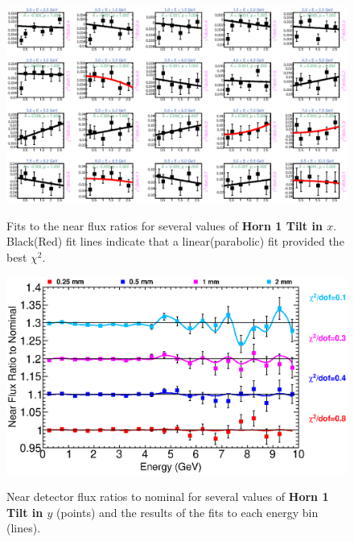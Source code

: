 {\begin{figure}[ht]
  \begin{center}
    {\includegraphics[width=5.0in]{figures/Horn1XTilt_near_fits.eps}}
  \end{center}
\caption{ Fits to the near flux ratios for several values of {\bf Horn 1 Tilt in $x$}. Black(Red) fit lines indicate that a linear(parabolic) fit provided the best $\chi^2$. }
\end{figure}

\begin{figure}[ht]
  \begin{center}
    {\includegraphics[width=6.0in]{figures/Horn1YTilt_near_summary.eps}}
  \end{center}
\caption{ Near detector flux ratios to nominal for several values of {\bf Horn 1 Tilt in $y$} (points) and the results of the fits to each energy bin (lines).}
\end{figure}

}
